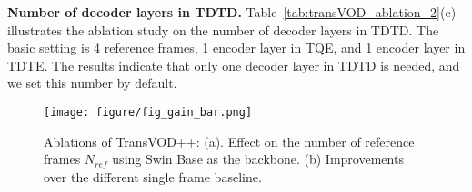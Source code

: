 \documentclass[10pt,journal,compsoc]{IEEEtran}
\begin{document}
\noindent \textbf{Number of decoder layers in TDTD.}
Table~\ref{tab:transVOD_ablation_2}(c) illustrates the ablation study on the number of decoder layers in TDTD. The basic setting is 4 reference frames, 1 encoder layer in TQE, and 1 encoder layer in TDTE. The results indicate that only one decoder layer in TDTD is needed, and we set this number by default.
\begin{figure}[t]
    \centering
    \texttt{[image: figure/fig\_gain\_bar.png]} 
    \caption{\small Ablations of TransVOD++: (a). Effect on the number of reference frames $N_{ref}$ using Swin Base as the backbone. (b) Improvements over the different single frame baseline.}
    \label{fig:transvod_plus}
\end{figure}


\begin{table*}[h!]
    \footnotesize
 \centering
 \caption{Ablation studies of TransVOD++ on ImageNet VID using  Swin Transformer Base (SwinB) as the backbone.}
\hfill
{}
\end{table*}
\end{document}
